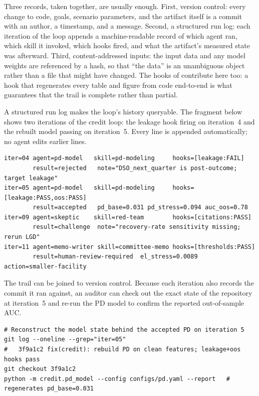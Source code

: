 Three records, taken together, are usually enough. First, version control: every
change to code, goals, scenario parameters, and the artifact itself is a commit
with an author, a timestamp, and a message. Second, a structured run log: each
iteration of the loop appends a machine-readable record of which agent ran, which
skill it invoked, which hooks fired, and what the artifact's measured state was
afterward. Third, content-addressed inputs: the input data and any model weights
are referenced by a hash, so that ``the data'' is an unambiguous object rather
than a file that might have changed. The hooks of 
contribute here too: a hook that regenerates every table and figure from code
end-to-end is what guarantees that the trail is complete rather than partial.

\begin{example}\label{ex:audit-run-log}
A structured run log makes the loop's history queryable. The fragment below shows
two iterations of the credit loop: the leakage hook firing on iteration~4 and
the rebuilt model passing on iteration~5. Every line is appended automatically;
no agent edits earlier lines.

\begin{verbatim}
iter=04 agent=pd-model   skill=pd-modeling     hooks=[leakage:FAIL]
        result=rejected   note="DSO_next_quarter is post-outcome; target leakage"
iter=05 agent=pd-model   skill=pd-modeling     hooks=[leakage:PASS,oos:PASS]
        result=accepted   pd_base=0.031 pd_stress=0.094 auc_oos=0.78
iter=09 agent=skeptic    skill=red-team        hooks=[citations:PASS]
        result=challenge  note="recovery-rate sensitivity missing; rerun LGD"
iter=11 agent=memo-writer skill=committee-memo hooks=[thresholds:PASS]
        result=human-review-required  el_stress=0.0089  action=smaller-facility
\end{verbatim}

\noindent The trail can be joined to version control. Because each iteration also
records the commit it ran against, an auditor can check out the exact state of
the repository at iteration~5 and re-run the PD model to confirm the reported
out-of-sample AUC.

\begin{verbatim}
# Reconstruct the model state behind the accepted PD on iteration 5
git log --oneline --grep="iter=05"
#   3f9a1c2 fix(credit): rebuild PD on clean features; leakage+oos hooks pass
git checkout 3f9a1c2
python -m credit.pd_model --config configs/pd.yaml --report   # regenerates pd_base=0.031
\end{verbatim}
\end{example}

